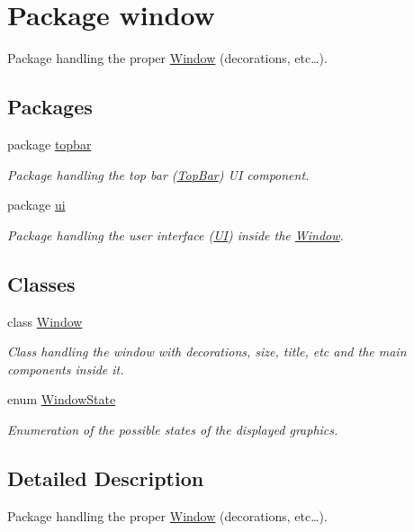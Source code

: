 \hypertarget{a00086}{\section{Package window}
\label{a00086}
}


Package handling the proper \hyperlink{a00037}{Window} (decorations, etc…).  


\subsection*{Packages}
\begin{DoxyCompactItemize}
\item 
package \hyperlink{a00087}{topbar}
\begin{DoxyCompactList}\small\item\em Package handling the top bar (\hyperlink{a00031}{Top\-Bar}) U\-I component. \end{DoxyCompactList}\item 
package \hyperlink{a00088}{ui}
\begin{DoxyCompactList}\small\item\em Package handling the user interface (\hyperlink{a00034}{U\-I}) inside the \hyperlink{a00037}{Window}. \end{DoxyCompactList}\end{DoxyCompactItemize}
\subsection*{Classes}
\begin{DoxyCompactItemize}
\item 
class \hyperlink{a00037}{Window}
\begin{DoxyCompactList}\small\item\em Class handling the window with decorations, size, title, etc and the main components inside it. \end{DoxyCompactList}\item 
enum \hyperlink{a00038}{Window\-State}
\begin{DoxyCompactList}\small\item\em Enumeration of the possible states of the displayed graphics. \end{DoxyCompactList}\end{DoxyCompactItemize}


\subsection{Detailed Description}
Package handling the proper \hyperlink{a00037}{Window} (decorations, etc…). 